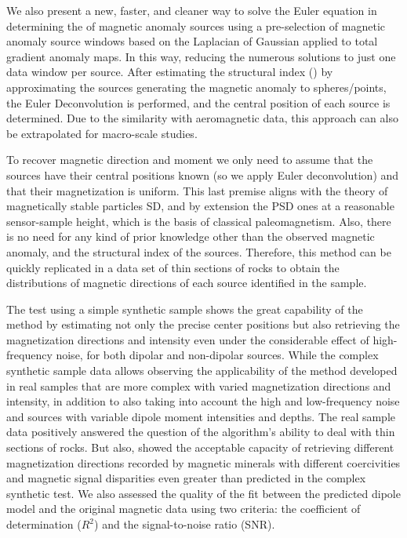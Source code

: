 We also present a new, faster, and cleaner way to solve the Euler equation in determining the \DIFdelbegin {}\DIFdelend \DIFaddbegin {}\DIFaddend of magnetic anomaly sources using a pre-selection of magnetic anomaly source windows based on the Laplacian of Gaussian applied to total gradient anomaly maps.
In this way, reducing the numerous solutions to just one data window per source.
After estimating the structural index (\DIFdelbegin {}\DIFdelend \DIFaddbegin {}\DIFaddend ) by approximating the sources generating the magnetic anomaly to spheres/points, the Euler Deconvolution is performed, and the central position of each source is determined.
Due to the similarity with aeromagnetic data, this approach can also be extrapolated for macro-scale studies.

To recover magnetic direction and moment we only need to assume that the sources have their central positions known (so we apply Euler deconvolution) and that their magnetization is uniform.
This last premise aligns with the theory of magnetically stable particles SD, and by extension the PSD ones at a reasonable sensor-sample height, which is the basis of classical paleomagnetism.
Also, there is no need for any kind of prior knowledge other than the observed magnetic anomaly, and the structural index of the sources.
Therefore, this method can be quickly replicated in a data set of thin sections of rocks to obtain the distributions of magnetic directions of each source identified in the sample.

The test using a simple synthetic sample shows the great capability of the method by estimating not only the precise center positions but also retrieving the magnetization directions and intensity even under the considerable effect of high-frequency noise, for both dipolar and non-dipolar sources.
While the complex synthetic sample data allows observing the applicability of the method developed in real samples that are more complex with varied magnetization directions and intensity, in addition to also taking into account the high and low-frequency noise and sources with variable dipole moment intensities and depths.
The real sample data positively answered the question of the algorithm's ability to deal with thin sections of rocks.
But also, showed the acceptable capacity of retrieving different magnetization directions recorded by magnetic minerals with different coercivities and magnetic signal disparities even greater than predicted in the complex synthetic test.
We also assessed the quality of the fit between the predicted dipole model and the original magnetic data using two criteria: the coefficient of determination ($R^2$) and the signal-to-noise ratio (SNR).

